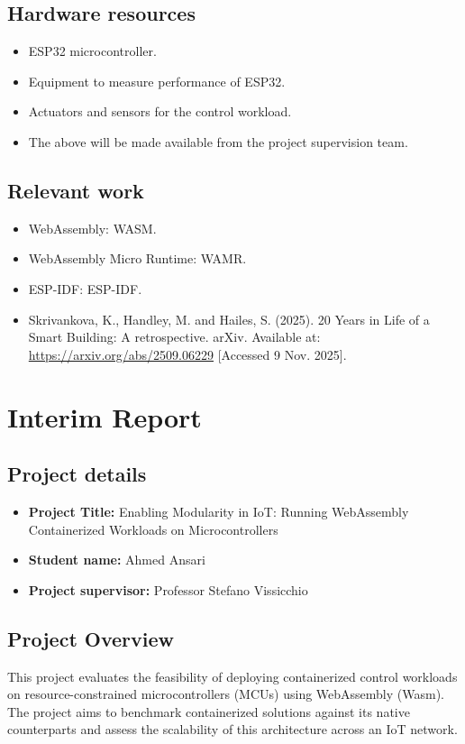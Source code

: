 \documentclass[12pt, a4paper]{report}
\begin{document}
\section*{Hardware resources}
\begin{itemize}
    \item ESP32 microcontroller.
    \item Equipment to measure performance of ESP32.
    \item Actuators and sensors for the control workload.
    \item The above will be made available from the project supervision team.
\end{itemize}

\section*{Relevant work}
\begin{itemize}
    \item WebAssembly: WASM.
    \item WebAssembly Micro Runtime: WAMR.
    \item ESP-IDF: ESP-IDF.
    \item Skrivankova, K., Handley, M. and Hailes, S. (2025). 20 Years in Life of a Smart Building: A retrospective. arXiv. Available at: \url{https://arxiv.org/abs/2509.06229} [Accessed 9 Nov. 2025].
\end{itemize}

\chapter{Interim Report}

\section*{Project details}
\begin{itemize}
    \item \textbf{Project Title:} Enabling Modularity in IoT: Running WebAssembly Containerized Workloads on Microcontrollers
    \item \textbf{Student name:} Ahmed Ansari
    \item \textbf{Project supervisor:} Professor Stefano Vissicchio
\end{itemize}

\section*{Project Overview}
This project evaluates the feasibility of deploying containerized control workloads on resource-constrained microcontrollers (MCUs) using WebAssembly (Wasm). The project aims to benchmark containerized solutions against its native counterparts and assess the scalability of this architecture across an IoT network.
\end{document}
